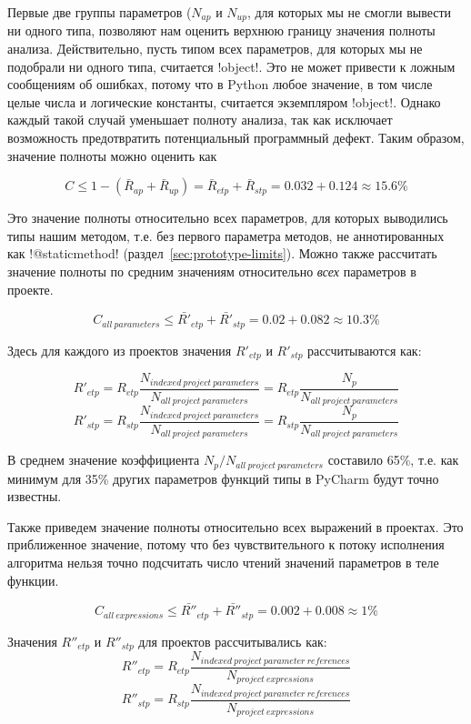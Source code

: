 Первые две группы параметров ($N_{ap}$ и $N_{up}$, для которых мы не смогли
вывести ни одного типа, позволяют нам оценить верхнюю границу значения полноты
анализа. Действительно, пусть типом всех параметров, для которых мы не подобрали
ни одного типа, считается !object!. Это не может привести к ложным сообщениям об
ошибках, потому что в Python любое значение, в том числе целые числа и
логические константы, считается экземпляром !object!. Однако каждый такой случай
уменьшает полноту анализа, так как исключает возможность предотвратить
потенциальный программный дефект. Таким образом, значение полноты можно оценить
как

\[
  C \le 1 - (\bar{R}_{ap} + \bar{R}_{up}) = \bar{R}_{etp} +
  \bar{R}_{stp} = 0.032 + 0.124 \approx 15.6\%
\]

Это значение полноты относительно всех параметров, для которых выводились типы
нашим методом, т.е. без первого параметра методов, не аннотированных как
!@staticmethod! (раздел~\ref{sec:prototype-limits}). Можно также рассчитать
значение полноты по средним значениям относительно \emph{всех} параметров в
проекте.

\[
  C_{all~parameters} \le \bar{R'}_{etp} + \bar{R'}_{stp} = 0.02 + 0.082 \approx 10.3\% 
\]

Здесь для каждого из проектов значения $R'_{etp}$ и $R'_{stp}$ рассчитываются
как:

\[
  R'_{etp} = R_{etp}
  \frac{N_{indexed~project~parameters}}{N_{all~project~parameters}} = R_{etp}
  \frac{N_p}{N_{all~project~parameters}}
\]
\[
  R'_{stp} = R_{stp}
  \frac{N_{indexed~project~parameters}}{N_{all~project~parameters}} = R_{stp}
  \frac{N_p}{N_{all~project~parameters}}
\]

В среднем значение коэффициента $N_p / N_{all~project~parameters}$ составило
65\%, т.е. как минимум для 35\% других параметров функций типы в PyCharm будут
точно известны.

Также приведем значение полноты относительно всех выражений в проектах. Это
приближенное значение, потому что без чувствительного к потоку исполнения
алгоритма нельзя точно подсчитать число чтений значений параметров в
теле функции.

\[
  C_{all~expressions} \le \bar{R''}_{etp} + \bar{R''}_{stp} = 0.002
  + 0.008 \approx 1\% 
\]

Значения $R''_{etp}$ и $R''_{stp}$ для проектов рассчитывались как:
\[
  R''_{etp} = R_{etp}
  \frac{N_{indexed~project~parameter~references}}{N_{project~expressions}}
\]
\[
  R''_{stp} = R_{stp}
  \frac{N_{indexed~project~parameter~references}}{N_{project~expressions}}
\]

